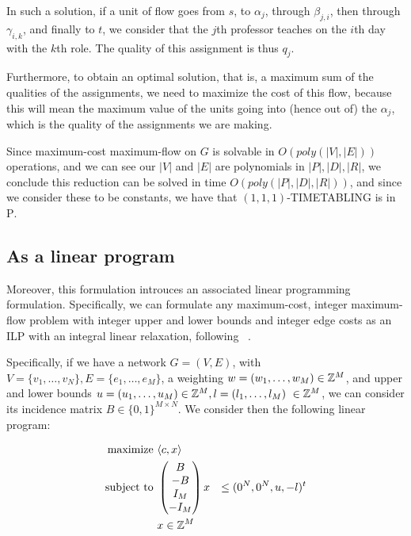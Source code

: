 In such a solution, if a unit of flow goes from $s$, to $\alpha_j$, through $\beta_{j, i}$, then through $\gamma_{i, k}$, and finally to $t$, we consider that the $j$th professor teaches on the $i$th day with the $k$th role. The quality of this assignment is thus $q_j$.

Furthermore, to obtain an optimal solution, that is, a maximum sum of the qualities of the assignments, we need to maximize the cost of this flow, because this will mean the maximum value of the units going into (hence out of) the $\alpha_j$, which is the quality of the assignments we are making.

Since maximum-cost maximum-flow on $G$ is solvable in $O(poly(|V|, |E|))$ operations, and we can see our $|V|$ and $|E|$ are polynomials in $|P|, |D|, |R|$, we conclude this reduction can be solved in time $O(poly(|P|, |D|, |R|))$, and since we consider these to be constants, we have that $(1, 1, 1)$-TIMETABLING is in \textsc{P}.

\subsection{As a linear program}
Moreover, this formulation introuces an associated linear programming formulation. Specifically, we can formulate any maximum-cost, integer maximum-flow problem with integer upper and lower bounds and integer edge costs as an ILP with an integral linear relaxation, following ~\cite{Ahuja93}.

Specifically, if we have a network $G = (V, E)$, with $V = \{v_1, \dots, v_N\}, E = \{e_1, \dots, e_M\}$, a weighting $w = (w_1, \dots, w_M) \in \mathbb{Z}^M$, and upper and lower bounds $u = (u_1, \dots, u_M) \in \Z^M, l = (l_1, \dots, l_M) \in \Z^M$, we can consider its incidence matrix $B \in \{0, 1\}^{M \times N}$. We consider then the following linear program:

\begin{alignat*}{2}
  \text{maximize }   & \langle c, x \rangle & \\
  \text{subject to } & \begin{pmatrix}
                         B\\
                        -B\\
                         I_M\\
                        -I_M
                       \end{pmatrix} x &\le (0^N, 0^N, u, -l)^t\\
                     & x \in \mathbb{Z}^M &
\end{alignat*}

